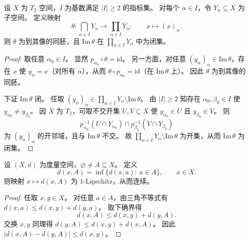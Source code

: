 \documentclass[lang=cn,a4paper,newtx,figureplace=section,tableplace=section]{elegantbook}
\begin{document}
\begin{lemma}\label{lem:diagonal-embedding-closed-image}
  设 $X$ 为 $T_2$ 空间，$I$ 为基数满足 $|I|\ge 2$ 的指标集。
  对每个 $\alpha\in I$，令 $Y_\alpha\subseteq X$ 为子空间。
  定义映射
  \[
    \theta:\bigcap_{\alpha\in I}Y_\alpha\to\prod_{\alpha\in I}Y_\alpha,\qquad x\mapsto (x)_\alpha.
  \]
  则 $\theta$ 为到其像的同胚，且 $\mathrm{Im}\,\theta$ 在 $\prod_{\alpha\in I}Y_\alpha$ 中为闭集。
\end{lemma}
\begin{proof}
  取任意 $\alpha_0\in I$。
  显然 $p_{\alpha_0}\circ\theta=\mathrm{id}$。
  另一方面，对任意 $(y_\alpha)_\alpha\in\mathrm{Im}\,\theta$，存在 $x$ 使 $y_\alpha=x$（对所有 $\alpha$），从而 $\theta\circ p_{\alpha_0}=\mathrm{id}$（在 $\mathrm{Im}\,\theta$ 上）。
  因此 $\theta$ 为到其像的同胚。

  下证 $\mathrm{Im}\,\theta$ 闭。
  任取 $(y_\alpha)_\alpha\in\prod_{\alpha\in I}Y_\alpha\setminus\mathrm{Im}\,\theta$。
  由 $|I|\ge 2$ 知存在 $\alpha_0,\beta_0\in I$ 使 $y_{\alpha_0}\ne y_{\beta_0}$。
  因 $X$ 为 $T_2$，可取不交开集 $U,V\subseteq X$ 使 $y_{\alpha_0}\in U$ 且 $y_{\beta_0}\in V$。
  则
  \[
    p_{\alpha_0}^{-1}(U\cap Y_{\alpha_0})\cap p_{\beta_0}^{-1}(V\cap Y_{\beta_0})
  \]
  为 $(y_\alpha)_\alpha$ 的开邻域，且与 $\mathrm{Im}\,\theta$ 不交。
  故 $\prod_{\alpha\in I}Y_\alpha\setminus\mathrm{Im}\,\theta$ 为开集，从而 $\mathrm{Im}\,\theta$ 为闭集。
 \end{proof}


\begin{lemma}\label{lem:distance-to-set-lipschitz}
  设 $(X,d)$ 为度量空间，$\varnothing\ne A\subseteq X$。
  定义
  \[
    d(x,A)=\inf\{d(x,a):\ a\in A\},\qquad x\in X.
  \]
  则映射 $x\mapsto d(x,A)$ 为 $1$-Lipschitz，从而连续。
\end{lemma}
\begin{proof}
  任取 $x,y\in X$。
  对任意 $a\in A$，由三角不等式有 $d(x,a)\le d(x,y)+d(y,a)$。
  取下确界得
  \[
    d(x,A)\le d(x,y)+d(y,A).
  \]
  交换 $x,y$ 同理得 $d(y,A)\le d(x,y)+d(x,A)$。
  因此 $|d(x,A)-d(y,A)|\le d(x,y)$。
\end{proof}
\end{document}
